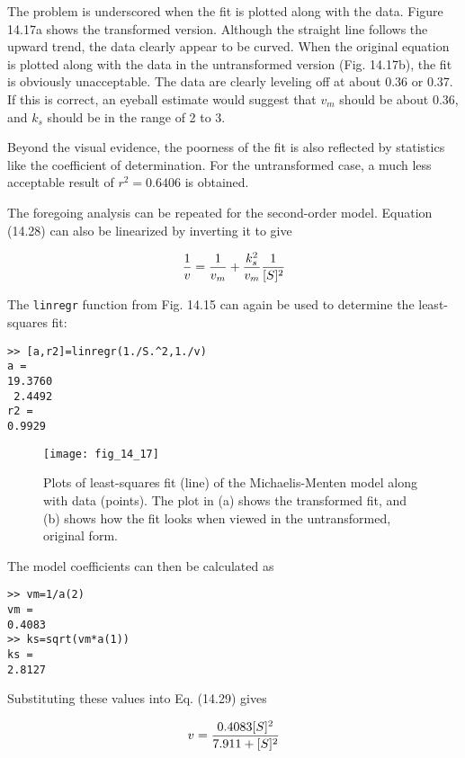 \documentclass[../main.tex]{subfiles}
\begin{document}
The problem is underscored when the fit is plotted along with the data. Figure 14.17a shows the transformed version. Although the straight line follows the upward trend, the data clearly appear to be curved. When the original equation is plotted along with the data in the untransformed version (Fig. 14.17b), the fit is obviously unacceptable. The data are clearly leveling off at about 0.36 or 0.37. If this is correct, an eyeball estimate would suggest that $v_m$ should be about 0.36, and $k_s$ should be in the range of 2 to 3.

Beyond the visual evidence, the poorness of the fit is also reflected by statistics like the coefficient of determination. For the untransformed case, a much less acceptable result of $r^2 = 0.6406$ is obtained.


The foregoing analysis can be repeated for the second-order model. Equation (14.28) can also be linearized by inverting it to give

\begin{equation}
	\notag
	\frac{1}{v} = \frac{1}{v_m} + \frac{k^2_s}{v_m} \frac{1}{[S]^2}
\end{equation}

The \texttt{linregr} function from Fig. 14.15 can again be used to determine the least-squares fit:

\begin{lstlisting}[numbers=none] 
>> [a,r2]=linregr(1./S.^2,1./v)
a =
19.3760
 2.4492
r2 =
0.9929
\end{lstlisting}

\begin{figure}[H] 
	\centering
	\texttt{[image: fig\_14\_17]}
	\caption{\textsf{Plots of least-squares fit (line) of the Michaelis-Menten model along with data (points). The plot in (a) shows the transformed fit, and (b) shows how the fit looks when viewed in the untransformed, original form.}}
	\label{fig:fig_14_17}
\end{figure}

\noindent The model coefficients can then be calculated as

\begin{lstlisting}[numbers=none] 
>> vm=1/a(2)
vm =
0.4083
>> ks=sqrt(vm*a(1))
ks =
2.8127
\end{lstlisting}

\noindent Substituting these values into Eq. (14.29) gives

\begin{equation}
	\notag
	v = \frac{0.4083[S]^2}{7.911 + [S]^2}
\end{equation}
\end{document}
